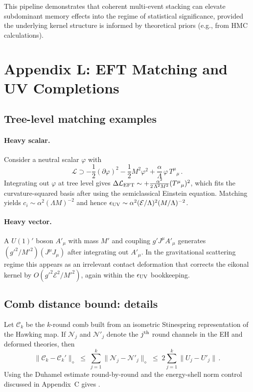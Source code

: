 \documentclass[a4paper,11pt]{article}
\newcommand{\eg}{e.g.\xspace}
\newcommand{\HMC}{\textsc{HMC}\xspace}
\theoremstyle{plain}
\theoremstyle{definition}
\theoremstyle{remark}
\begin{document}
This pipeline demonstrates that coherent multi-event stacking can elevate subdominant memory effects into the regime of statistical significance, provided the underlying kernel structure is informed by theoretical priors (\eg, from \HMC{} calculations).

\section{Appendix L: EFT Matching and UV Completions}\label{app:new-physics-eft}

\subsection{Tree-level matching examples}
\paragraph{Heavy scalar.} Consider a neutral scalar $\varphi$ with
\begin{equation}
\mathcal{L}\supset -\frac{1}{2}(\partial\varphi)^2-\frac{1}{2}M^2\varphi^2+\frac{\alpha}{\Lambda}\,\varphi\,T^\mu{}_\mu\,.
\end{equation}
Integrating out $\varphi$ at tree level gives $\Delta\mathcal{L}_{\rm EFT}\sim +\frac{\alpha^2}{2\,\Lambda^2 M^2}(T^\mu{}_\mu)^2$, which fits the curvature-squared basis after using the semiclassical Einstein equation. Matching yields $c_i\sim \alpha^2(\Lambda M)^{-2}$ and hence $\epsilon_{\rm UV}\sim \alpha^2(\mathcal{E}/\Lambda)^2(M/\Lambda)^{-2}$.

\paragraph{Heavy vector.} A $U(1)'$ boson $A'_\mu$ with mass $M'$ and coupling $g' J^\mu A'_\mu$ generates $(g'^2/M'^2)(J^\mu J_\mu)$ after integrating out $A'_\mu$. In the gravitational scattering regime this appears as an irrelevant contact deformation that corrects the eikonal kernel by $O(g'^2 \mathcal{E}^2/M'^2)$, again within the $\epsilon_{\rm UV}$ bookkeeping.

\subsection{Comb distance bound: details}
Let $\mathcal{C}_k$ be the $k$-round comb built from an isometric Stinespring representation of the Hawking map. If $\mathcal{N}_j$ and $\mathcal{N}'_j$ denote the $j^{\rm th}$ round channels in the EH and deformed theories, then
\begin{equation}
\big\|\mathcal{C}_k-\mathcal{C}_k'\big\|_\diamond \;\le\; \sum_{j=1}^k \big\|\mathcal{N}_j-\mathcal{N}'_j\big\|_\diamond \;\le\; 2\sum_{j=1}^k \big\|U_j-U'_j\big\|\,.
\end{equation}
Using the Duhamel estimate round-by-round and the energy-shell norm control discussed in Appendix~C gives .
\end{document}
